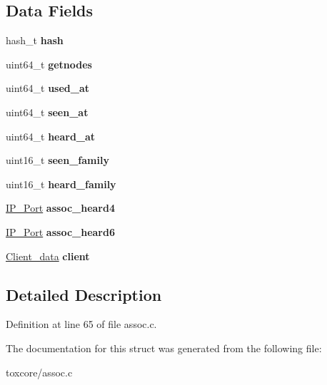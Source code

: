 \subsection*{Data Fields}
\begin{DoxyCompactItemize}
\item 
\hypertarget{struct_client__entry_a35aa0f6864b81ef3de3d4d46ef823a0c}{hash\+\_\+t {\bfseries hash}}\label{struct_client__entry_a35aa0f6864b81ef3de3d4d46ef823a0c}

\item 
\hypertarget{struct_client__entry_aec732782691c39a31d8c579a79a8fed2}{uint64\+\_\+t {\bfseries getnodes}}\label{struct_client__entry_aec732782691c39a31d8c579a79a8fed2}

\item 
\hypertarget{struct_client__entry_aa4c583563fdc794eea3b70dcf92870f4}{uint64\+\_\+t {\bfseries used\+\_\+at}}\label{struct_client__entry_aa4c583563fdc794eea3b70dcf92870f4}

\item 
\hypertarget{struct_client__entry_ab632ae1b8a283a06d6cb3881c377c6cd}{uint64\+\_\+t {\bfseries seen\+\_\+at}}\label{struct_client__entry_ab632ae1b8a283a06d6cb3881c377c6cd}

\item 
\hypertarget{struct_client__entry_a0886ba8c555aa6352f2dbf0606636f13}{uint64\+\_\+t {\bfseries heard\+\_\+at}}\label{struct_client__entry_a0886ba8c555aa6352f2dbf0606636f13}

\item 
\hypertarget{struct_client__entry_ac06f60c25b78ef1fce357680b1e5701f}{uint16\+\_\+t {\bfseries seen\+\_\+family}}\label{struct_client__entry_ac06f60c25b78ef1fce357680b1e5701f}

\item 
\hypertarget{struct_client__entry_a1b6b0c24ebf14b86b051d63bd47ffb27}{uint16\+\_\+t {\bfseries heard\+\_\+family}}\label{struct_client__entry_a1b6b0c24ebf14b86b051d63bd47ffb27}

\item 
\hypertarget{struct_client__entry_a85c7d2390e7cf32bb433484f958205f1}{\hyperlink{struct_i_p___port}{I\+P\+\_\+\+Port} {\bfseries assoc\+\_\+heard4}}\label{struct_client__entry_a85c7d2390e7cf32bb433484f958205f1}

\item 
\hypertarget{struct_client__entry_ae6c8f7476cc280c4f1ef1ea4799e728e}{\hyperlink{struct_i_p___port}{I\+P\+\_\+\+Port} {\bfseries assoc\+\_\+heard6}}\label{struct_client__entry_ae6c8f7476cc280c4f1ef1ea4799e728e}

\item 
\hypertarget{struct_client__entry_a114cded03654e9d27771e24fa1712e39}{\hyperlink{struct_client__data}{Client\+\_\+data} {\bfseries client}}\label{struct_client__entry_a114cded03654e9d27771e24fa1712e39}

\end{DoxyCompactItemize}


\subsection{Detailed Description}


Definition at line 65 of file assoc.\+c.



The documentation for this struct was generated from the following file\+:\begin{DoxyCompactItemize}
\item 
toxcore/assoc.\+c\end{DoxyCompactItemize}
